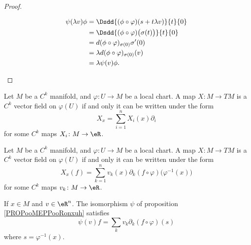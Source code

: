 \begin{proof}
\begin{subproof}
		\begin{subequations}
			\begin{align}
				\psi(\lambda v)\phi & =\Dsdd{ (\phi\circ\varphi)(s+t\lambda v) }{t}{0}        \\
				                    & =\Dsdd{ (\phi\circ\varphi)\big( \sigma(t) \big) }{t}{0} \\
				                    & =d(\phi\circ\varphi)_{\sigma(0)}\sigma'(0)              \\
				                    & =\lambda d(\phi\circ\varphi)_{\sigma(0)}(v)             \\
				                    & =\lambda\psi(v)\phi.
			\end{align}
		\end{subequations}
	\end{subproof}
\end{proof}

\begin{proposition}		\label{PROPooXURIooYPytwa}
	Let \( M\) be a \( C^k\) manifold, and \( \varphi\colon U\to M\) be a local chart. A map \( X\colon M\to TM\) is a \( C^k\) vector field on \( \varphi(U)\) if and only it can be written under the form
	\begin{equation}
		X_x=\sum_{i=1}^nX_i(x)\partial_i
	\end{equation}
	for some \( C^k\) maps \( X_i\colon M\to \eR\).
\end{proposition}

\begin{lemma}        \label{LEMooZWFAooDlYaJm}
	Let \( M\) be a \( C^k\) manifold, and \( \varphi\colon U\to M\) be a local chart. A map \( X\colon M\to TM\) is a \( C^k\) vector field on \( \varphi(U)\) if and only it can be written under the form
	\begin{equation}
		X_x(f)=\sum_{k=1}^nv_k(x)\partial_k(f\circ\varphi)\big( \varphi^{-1}(x) \big)
	\end{equation}
	for some \( C^k\) maps \( v_k\colon M\to \eR\).
\end{lemma}

\begin{lemma}       \label{LEMooIQZWooOSLNXB}
	If \( x\in M\) and \( v\in \eR^n\). The isomorphism \( \psi\) of proposition \ref{PROPooMEPPooRonxuh} satisfies
	\begin{equation}        \label{EQooBVOBooBTfYWC}
		\psi(v)f=\sum_kv_k\partial_k(f\circ\varphi)(s)
	\end{equation}
	where \( s=\varphi^{-1}(x)\).
\end{lemma}

